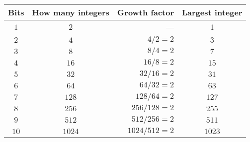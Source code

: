 \begin{tabular}{ccrc}                                           \toprule
Bits & How many integers & Growth factor    & Largest integer \\\midrule
$1$  & $2$               & ---              & $1$             \\
$2$  & $4$               & $4 / 2 = 2$      & $3$             \\
$3$  & $8$               & $8 / 4 = 2$      & $7$             \\
$4$  & $16$              & $16 / 8 = 2$     & $15$            \\
$5$  & $32$              & $32 / 16 = 2$    & $31$            \\
$6$  & $64$              & $64 / 32 = 2$    & $63$            \\
$7$  & $128$             & $128 / 64 = 2$   & $127$           \\
$8$  & $256$             & $256 / 128 = 2$  & $255$           \\
$9$  & $512$             & $512 / 256 = 2$  & $511$           \\
$10$ & $1024$            & $1024 / 512 = 2$ & $1023$          \\\bottomrule
\end{tabular}
